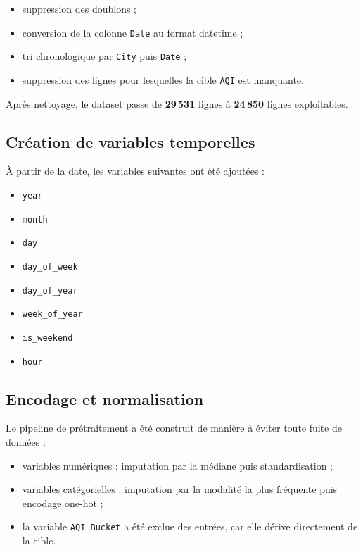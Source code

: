 \documentclass[11pt,a4paper]{article}
\newcommand{\aqi}{\texttt{AQI}}
\newcommand{\aqibucket}{\texttt{AQI\_Bucket}}
\begin{document}
\begin{itemize}
    \item suppression des doublons ;
    \item conversion de la colonne \texttt{Date} au format datetime ;
    \item tri chronologique par \texttt{City} puis \texttt{Date} ;
    \item suppression des lignes pour lesquelles la cible \aqi{} est manquante.
\end{itemize}

Après nettoyage, le dataset passe de \textbf{29\,531} lignes à \textbf{24\,850} lignes exploitables.

\subsection{Création de variables temporelles}
À partir de la date, les variables suivantes ont été ajoutées :

\begin{itemize}
    \item \texttt{year}
    \item \texttt{month}
    \item \texttt{day}
    \item \texttt{day\_of\_week}
    \item \texttt{day\_of\_year}
    \item \texttt{week\_of\_year}
    \item \texttt{is\_weekend}
    \item \texttt{hour}
\end{itemize}

\subsection{Encodage et normalisation}
Le pipeline de prétraitement a été construit de manière à éviter toute fuite de données :

\begin{itemize}
    \item variables numériques : imputation par la médiane puis standardisation ;
    \item variables catégorielles : imputation par la modalité la plus fréquente puis encodage one-hot ;
    \item la variable \aqibucket{} a été exclue des entrées, car elle dérive directement de la cible.
\end{itemize}
\end{document}
